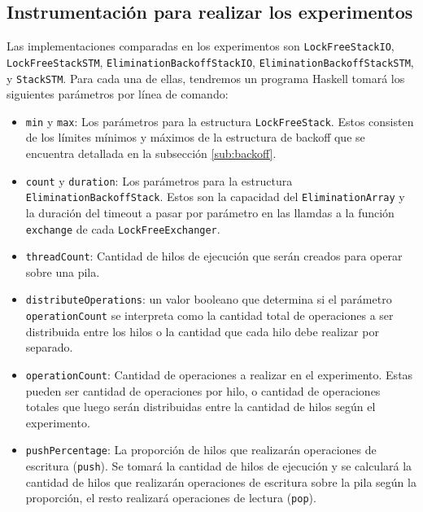 \subsection{Instrumentación para realizar los experimentos}\label{subsec:experiment-harness}
Las implementaciones comparadas en los experimentos son \texttt{LockFreeStackIO}, \texttt{LockFreeStackSTM}, \texttt{EliminationBackoffStackIO}, \texttt{EliminationBackoffStackSTM}, y \texttt{StackSTM}. Para cada una de ellas, tendremos un programa Haskell tomará los siguientes parámetros por línea de comando:

\begin{itemize}
    \item \texttt{min} y \texttt{max}: Los parámetros para la estructura \texttt{LockFreeStack}. Estos consisten de los límites mínimos y máximos de la estructura de backoff que se encuentra detallada en la subsección \ref{sub:backoff}.
    \item \texttt{count} y \texttt{duration}: Los parámetros para la estructura \texttt{EliminationBackoffStack}. Estos son la capacidad del \texttt{EliminationArray} y la duración del timeout a pasar por parámetro en las llamdas a la función \texttt{exchange} de cada \texttt{LockFreeExchanger}.
    \item \texttt{threadCount}: Cantidad de hilos de ejecución que serán creados para operar sobre una pila.
    \item \texttt{distributeOperations}: un valor booleano que determina si el parámetro \texttt{operationCount} se interpreta como la cantidad total de operaciones a ser distribuida entre los hilos o la cantidad que cada hilo debe realizar por separado.
    \item \texttt{operationCount}: Cantidad de operaciones a realizar en el experimento. Estas pueden ser cantidad de operaciones por hilo, o cantidad de operaciones totales que luego serán distribuidas entre la cantidad de hilos según el experimento.
    \item \texttt{pushPercentage}: La proporción de hilos que realizarán operaciones de escritura (\texttt{push}). Se tomará la cantidad de hilos de ejecución y se calculará la cantidad de hilos que realizarán operaciones de escritura sobre la pila según la proporción, el resto realizará operaciones de lectura (\texttt{pop}).
\end{itemize}

